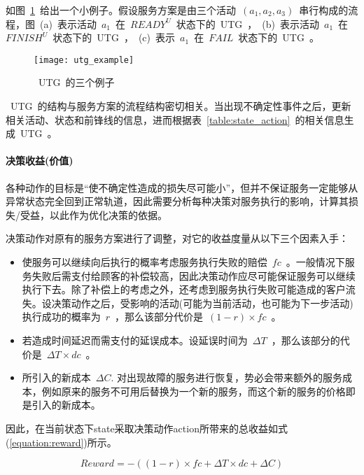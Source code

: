 如图~\ref{figure:utg_example}~给出一个小例子。假设服务方案是由三个活动~$(a_1, a_2, a_3)$~串行构成的流程，图~(a)~表示活动~$a_1$~在~$READY^U$~状态下的~UTG~，~(b)~表示活动~$a_1$~在~$FINISH^U$~状态下的~UTG~，~(c)~表示~$a_1$~在~$FAIL$~状态下的~UTG~。

\begin{figure}[htbp]
    \centering
    \texttt{[image: utg\_example]}
    \caption{~UTG~的三个例子}\label{figure:utg_example}
    \vspace{-1em}
\end{figure}

~UTG~的结构与服务方案的流程结构密切相关。当出现不确定性事件之后，更新相关活动、状态和前锋线的信息，进而根据表~\ref{table:state_action}~的相关信息生成~UTG~。

\paragraph{决策收益(价值)} \label{sec:reward_section}

各种动作的目标是“使不确定性造成的损失尽可能小”，但并不保证服务一定能够从异常状态完全回到正常轨道，因此需要分析每种决策对服务执行的影响，计算其损失/受益，以此作为优化决策的依据。

决策动作对原有的服务方案进行了调整，对它的收益度量从以下三个因素入手：

\begin{itemize}

\item 使服务可以继续向后执行的概率考虑服务执行失败的赔偿~$fc$~。一般情况下服务失败后需支付给顾客的补偿较高，因此决策动作应尽可能保证服务可以继续执行下去。除了补偿上的考虑之外，还考虑到服务执行失败可能造成的客户流失。设决策动作之后，受影响的活动(可能为当前活动，也可能为下一步活动)执行成功的概率为~$r$~，那么该部分代价是~$(1-r) \times fc$~。

\item 若造成时间延迟而需支付的延误成本。设延误时间为~$\Delta T$~，那么该部分的代价是~$\Delta T \times dc$~。

\item 所引入的新成本~$\Delta C$. 对出现故障的服务进行恢复，势必会带来额外的服务成本，例如原来的服务不可用后替换为一个新的服务，而这个新的服务的价格即是引入的新成本。

\end{itemize}

因此，在当前状态下state采取决策动作action所带来的总收益如式(\ref{equation:reward})所示。

\begin{equation}\label{equation:reward}
Reward =  - ((1 - r) \times fc + \Delta T \times dc + \Delta C)
\end{equation}

